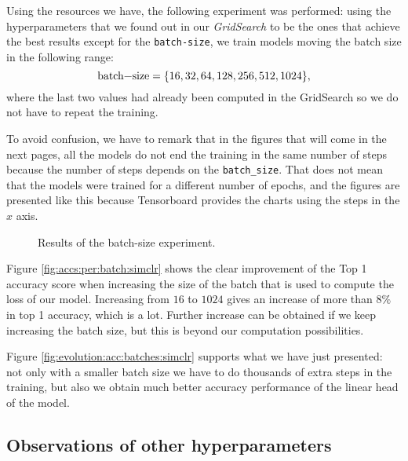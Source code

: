 Using the resources we have, the following experiment was performed: using the hyperparameters that we found out in our \emph{GridSearch} to be the ones that achieve the best results except for the \lstinline{batch-size}, we train models moving the batch size in the following range: 
$$
\text{\lstinline{batch-size}}=\{16,32,64,128,256,512,1024\},
$$
where the last two values had already been computed in the GridSearch so we do not have to repeat the training. 

\begin{remark}
    To avoid confusion, we have to remark that in the figures that will come in the next pages, all the models do not end the training in the same number of steps because the number of steps depends on the \lstinline{batch_size}. That does not mean that the models were trained for a different number of epochs, and the figures are presented like this because Tensorboard provides the charts using the steps in the $x$ axis. 
\end{remark}

\begin{figure}[htp] 
    \centering
    \hfill%
        \caption{Results of the batch-size experiment.}
\end{figure}

Figure \ref{fig:accs:per:batch:simclr} shows the clear improvement of the Top 1 accuracy score when increasing the size of the batch that is used to compute the loss of our model. Increasing from $16$ to $1024$ gives an increase of more than $8\%$ in top 1 accuracy, which is a lot. Further increase can be obtained if we keep increasing the batch size, but this is beyond our computation possibilities.

Figure \ref{fig:evolution:acc:batches:simclr} supports what we have just presented: not only with a smaller batch size we have to do thousands of extra steps in the training, but also we obtain much better accuracy performance of the linear head of the model.

\subsection*{Observations of other hyperparameters}

